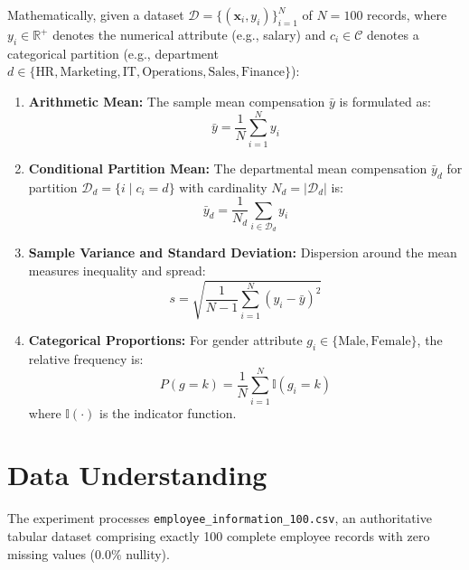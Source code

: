\documentclass[12pt,a4paper]{report}
\begin{document}
Mathematically, given a dataset $\mathcal{D} = \{(\mathbf{x}_i, y_i)\}_{i=1}^{N}$ of $N = 100$ records, where $y_i \in \mathbb{R}^+$ denotes the numerical attribute (e.g., salary) and $c_i \in \mathcal{C}$ denotes a categorical partition (e.g., department $d \in \{\text{HR}, \text{Marketing}, \text{IT}, \text{Operations}, \text{Sales}, \text{Finance}\}$):
\begin{enumerate}
    \item \textbf{Arithmetic Mean:} The sample mean compensation $\bar{y}$ is formulated as:
    \begin{equation}
        \bar{y} = \frac{1}{N} \sum_{i=1}^{N} y_i
    \end{equation}
    \item \textbf{Conditional Partition Mean:} The departmental mean compensation $\bar{y}_d$ for partition $\mathcal{D}_d = \{i \mid c_i = d\}$ with cardinality $N_d = |\mathcal{D}_d|$ is:
    \begin{equation}
        \bar{y}_d = \frac{1}{N_d} \sum_{i \in \mathcal{D}_d} y_i
    \end{equation}
    \item \textbf{Sample Variance and Standard Deviation:} Dispersion around the mean measures inequality and spread:
    \begin{equation}
        s = \sqrt{\frac{1}{N-1} \sum_{i=1}^{N} (y_i - \bar{y})^2}
    \end{equation}
    \item \textbf{Categorical Proportions:} For gender attribute $g_i \in \{\text{Male}, \text{Female}\}$, the relative frequency is:
    \begin{equation}
        P(g = k) = \frac{1}{N} \sum_{i=1}^{N} \mathbb{I}(g_i = k)
    \end{equation}
    where $\mathbb{I}(\cdot)$ is the indicator function.
\end{enumerate}

\section{Data Understanding}
The experiment processes \texttt{employee\_information\_100.csv}, an authoritative tabular dataset comprising exactly 100 complete employee records with zero missing values ($0.0\%$ nullity). 
\end{document}
